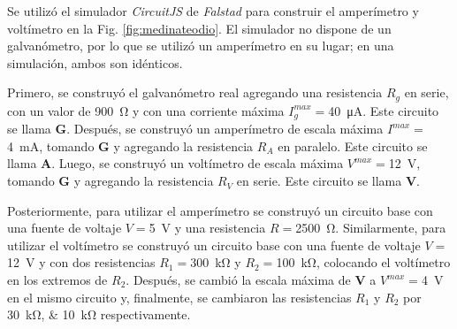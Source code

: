 Se utilizó el simulador {\it CircuitJS} de {\it Falstad} \cite{falstad}
para construir el amperímetro y voltímetro en la Fig. \ref{fig:medinateodio}.
El simulador no dispone de un galvanómetro, por lo que se utilizó un amperímetro
en su lugar; en una simulación, ambos son idénticos.

Primero, se construyó el galvanómetro real agregando una resistencia $R_g$ en serie,
con un valor de \qty{900}{\ohm} y con una corriente máxima
$I_g^{max}=$\qty{40}{\micro\ampere}. Este circuito se llama {\bf G}. Después, se construyó
un amperímetro de escala máxima $I^{max}=$\qty{4}{\milli\ampere}, 
tomando {\bf G} y agregando la resistencia $R_A$ en paralelo. Este circuito se llama
{\bf A}. Luego, se construyó un voltímetro de escala máxima
$V^{max}=$\qty{12}{\volt}, tomando {\bf G} y agregando la resistencia $R_V$ en
serie. Este circuito se llama {\bf V}.

Posteriormente, para utilizar el amperímetro se construyó un circuito base con una fuente
de voltaje $V=$\qty{5}{\volt} y una resistencia $R=$\qty{2500}{\ohm}. Similarmente, para
utilizar el
voltímetro se construyó un circuito base con una fuente de voltaje $V=$\qty{12}{\volt}
y con dos resistencias $R_1=$\qty{300}{\kilo\ohm} y $R_2=$\qty{100}{\kilo\ohm}, colocando
el voltímetro en los extremos de $R_2$. Después, se cambió la escala máxima de {\bf V} a $V^{max}=$\qty{4}{\volt} en el mismo
circuito y, finalmente, se cambiaron las resistencias $R_1$ y $R_2$ por
\qtylist{30;10}{\kilo\ohm} respectivamente.
